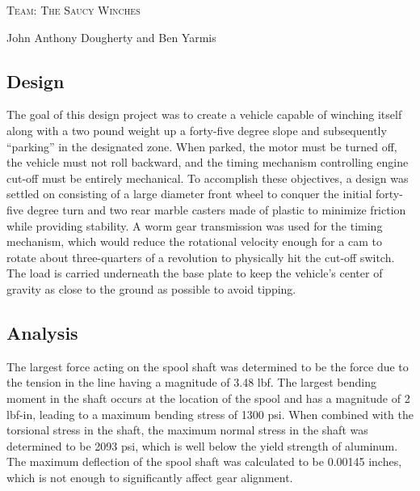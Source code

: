 \documentclass[10pt,letterpaper,oneside]{article}
\begin{document}

\centering
\begin{Huge}
\textsc{Team: The Saucy Winches}\\[.25cm]
\end{Huge}
\begin{Large}
John Anthony Dougherty and Ben Yarmis
\end{Large}

\hrulefill

\centering
\subsection*{Design}

\raggedright
The goal of this design project was to create a vehicle capable of winching itself along with a two pound weight up a forty-five degree slope and subsequently ``parking'' in the designated zone. When parked, the motor must be turned off, the vehicle must not roll backward, and the timing mechanism controlling engine cut-off must be entirely mechanical. To accomplish these objectives, a design was settled on consisting of a large diameter front wheel to conquer the initial forty-five degree turn and two rear marble casters made of plastic to minimize friction while providing stability. A worm gear transmission was used for the timing mechanism, which would reduce the rotational velocity enough for a cam to rotate about three-quarters of a revolution to physically hit the cut-off switch. The load is carried underneath the base plate to keep the vehicle's center of gravity as close to the ground as possible to avoid tipping.

\centering
\subsection*{Analysis}

\raggedright
The largest force acting on the spool shaft was determined to be the force due to the tension in the line having a magnitude of 3.48 lbf. The largest bending moment in the shaft occurs at the location of the spool and has a magnitude of 2 lbf-in, leading to a maximum bending stress of 1300 psi. When combined with the torsional stress in the shaft, the maximum normal stress in the shaft was determined to be 2093 psi, which is well below the yield strength of aluminum. The maximum deflection of the spool shaft was calculated to be 0.00145 inches, which is not enough to significantly affect gear alignment.
\end{document}
